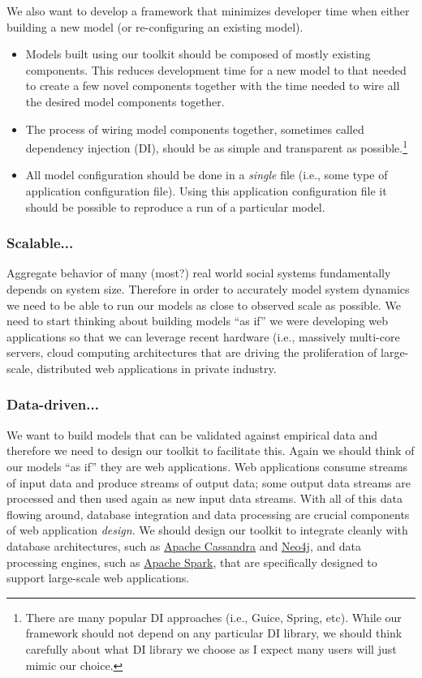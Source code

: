 \documentclass[11pt]{amsart}
\begin{document}
We also want to develop a framework that minimizes developer time when either building a new model (or re-configuring an existing model).
\begin{itemize}
    \item Models built using our toolkit should be composed of mostly existing components. This reduces development time for a new model to that needed to create a few novel components together with the time needed to wire all the desired model components together.
    \item The process of wiring model components together, sometimes called dependency injection (DI), should be as simple and transparent as possible.\footnote{
    There are many popular DI approaches (i.e., Guice, Spring, etc). While our framework should not depend on any particular DI library, we should think carefully about what DI library we choose as I expect many users will just mimic our choice.
    }
    \item All model configuration should be done in a \textit{single} file (i.e., some type of application configuration file).  Using this application configuration file it should be possible to reproduce a run of a particular model.
\end{itemize}

\subsubsection{Scalable...}
Aggregate behavior of many (most?) real world social systems fundamentally depends on system size. Therefore in order to accurately model system dynamics we need to be able to run our models as close to observed scale as possible. We need to start thinking about building models ``as if'' we were developing web applications so that we can leverage recent hardware (i.e., massively multi-core servers, cloud computing architectures that are driving the proliferation of large-scale, distributed web applications in private industry.

\subsubsection{Data-driven...}
We want to build models that can be validated against empirical data and therefore we need to design our toolkit to facilitate this.  Again we should think of our models ``as if'' they are web applications. Web applications consume streams of input data and produce streams of output data; some output data streams are processed and then used again as new input data streams. With all of this data flowing around, database integration and data processing are crucial components of web application \textit{design}. We should design our toolkit to integrate cleanly with database architectures, such as \href{http://cassandra.apache.org/}{Apache Cassandra} and \href{http://neo4j.com/}{Neo4j}, and data processing engines, such as \href{http://spark.apache.org/}{Apache Spark}, that are specifically designed to support large-scale web applications.
\end{document}
